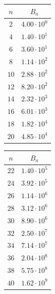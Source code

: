 \documentclass[11pt]{llncs}
\begin{document}
\begin{table}
    \centering
    \begin{minipage}{0.24\textwidth}
        \centering
        \begin{tabular}{|c|c|}
            \hline
            $n$ & $B_n$ \\
            \hline
            $2$  & $4.00 \cdot 10^{0}$  \\
            $4$  & $1.40 \cdot 10^{1}$  \\
            $6$  & $3.60 \cdot 10^{1}$  \\
            $8$  & $1.14 \cdot 10^{2}$  \\
            $10$ & $2.88 \cdot 10^{2}$  \\
            $12$ & $8.20 \cdot 10^{2}$  \\
            $14$ & $2.32 \cdot 10^{3}$  \\
            $16$ & $6.01 \cdot 10^{3}$  \\
            $18$ & $1.82 \cdot 10^{4}$  \\
            $20$ & $4.85 \cdot 10^{4}$  \\
            \hline
        \end{tabular}
    \end{minipage}%
    \begin{minipage}{0.24\textwidth}
        \centering
        \begin{tabular}{|c|c|}
            \hline
            $n$ & $B_n$ \\
            \hline
            $22$ & $1.40 \cdot 10^{5}$  \\
            $24$ & $3.92 \cdot 10^{5}$  \\
            $26$ & $1.14 \cdot 10^{6}$  \\
            $28$ & $3.12 \cdot 10^{6}$  \\
            $30$ & $8.90 \cdot 10^{6}$  \\
            $32$ & $2.50 \cdot 10^{7}$  \\
            $34$ & $7.14 \cdot 10^{7}$  \\
            $36$ & $2.04 \cdot 10^{8}$  \\
            $38$ & $5.75 \cdot 10^{8}$  \\
            $40$ & $1.62 \cdot 10^{9}$  \\
            \hline
        \end{tabular}
    \end{minipage}%
    \begin{minipage}{0.24\textwidth}

\end{minipage}
\end{table}
\end{document}
